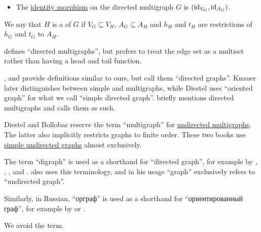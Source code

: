 \begin{definition}
\begin{thmenum}[resume=def:directed_multigraph]
\begin{itemize}
      \item The \hyperref[def:category/identity]{identity morphism} on the directed multigraph \( G \) is \( (\operatorname{id}_{V_G}, \operatorname{id}_{A_G}) \).
    \end{itemize}

    \mimprovised We say that \( H \) is a  of \( G \) if \( V_G \subseteq V_H \), \( A_G \subseteq A_H \) and \( h_H \) and \( t_H \) are restrictions of \( h_G \) and \( t_G \) to \( A_H \).
  \end{thmenum}
\end{definition}
\begin{comments}
  \item {} defines \enquote{directed multigraphs}, but prefers to treat the edge set as a multiset rather than having a head and tail function.

  ,  and  provide definitions similar to ours, but call them \enquote{directed graphs}. Knauer later distinguishes between simple and multigraphs, while Diestel uses \enquote{oriented graph} for what we call \enquote{simple directed graph}.  briefly mentions directed multigraphs and calls them as such.

  Diestel and Bollobas reserve the term \enquote{multigraph} for \hyperref[def:hypergraph/multigraph]{undirected multigraphs}. The latter also implicitly restricts graphs to finite order. These two books use \hyperref[def:undirected_graph]{simple undirected graphs} almost exclusively.
\end{comments}

\begin{remark}\label{rem:digraph}
  The term \enquote{digraph} is used as a shorthand for \enquote{directed graph}, for example by , , ,  and .  also uses this terminology, and in his usage \enquote{graph} exclusively refers to \enquote{undirected graph}.

  Similarly, in Russian, \enquote{орграф} is used as a shorthand for \enquote{ориентированный граф}, for example by  or .

  We avoid the term.
\end{remark}

